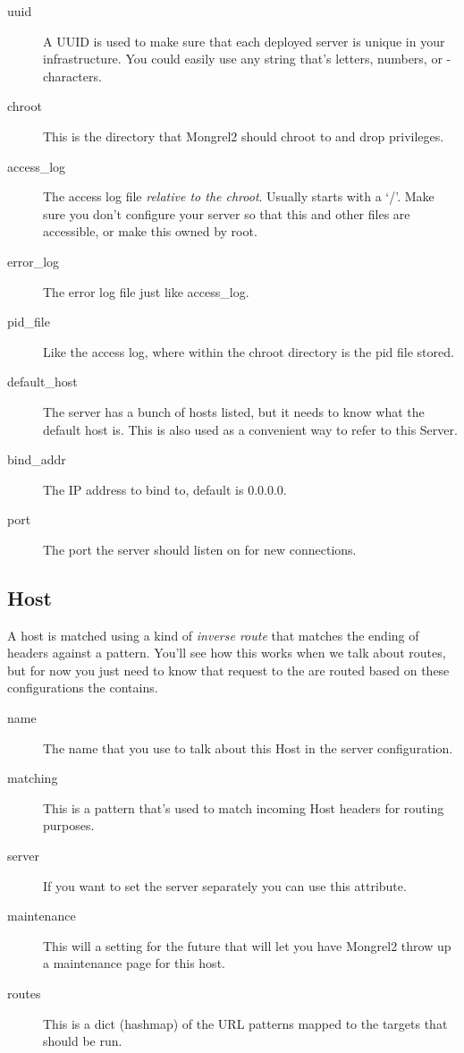 \begin{description}
\item[uuid] A UUID is used to make sure that each deployed server is unique in your infrastructure.
    You could easily use any string that's letters, numbers, or - characters.
\item[chroot] This is the directory that Mongrel2 should chroot to and drop privileges.
\item[access\_log] The access log file \emph{relative to the chroot}.  Usually starts with a `/'.  Make sure
    you don't configure your server so that this and other files are accessible, or make this owned by root.
\item[error\_log] The error log file just like access\_log.
\item[pid\_file] Like the access log, where within the chroot directory is the pid file stored.
\item[default\_host] The server has a bunch of hosts listed, but it needs to know what the default host is.  This is also
    used as a convenient way to refer to this Server.
\item[bind\_addr] The IP address to bind to, default is 0.0.0.0.
\item[port] The port the server should listen on for new connections.
\end{description}


\subsection{Host}

A host is matched using a kind of \emph{inverse route} that matches the ending of 
headers against a pattern.  You'll see how this works when we talk about routes, but for now
you just need to know that request to the  are routed based on these 
configurations the  contains.

\begin{description}
\item[name] The name that you use to talk about this Host in the server configuration.
\item[matching] This is a pattern that's used to match incoming Host headers for routing purposes.
\item[server] If you want to set the server separately you can use this attribute.
\item[maintenance] This will a setting for the future that will let you have Mongrel2 throw up a maintenance page
    for this host.
\item[routes] This is a dict (hashmap) of the URL patterns mapped to the targets that should be run.
\end{description}


